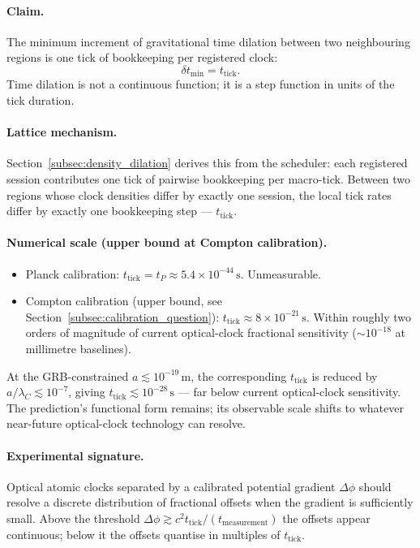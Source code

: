 \paragraph{Claim.}
The minimum increment of gravitational time dilation between two
neighbouring regions is one tick of bookkeeping per registered
clock:
\begin{equation}
    \delta t_\text{min} = t_\text{tick}.
    \label{eq:min_dilation_pred}
\end{equation}
Time dilation is not a continuous function; it is a step function in
units of the tick duration.

\paragraph{Lattice mechanism.}
Section~\ref{subsec:density_dilation} derives this from the
scheduler: each registered session contributes one tick of pairwise
bookkeeping per macro-tick. Between two regions whose clock
densities differ by exactly one session, the local tick rates differ
by exactly one bookkeeping step --- $t_\text{tick}$.

\paragraph{Numerical scale (upper bound at Compton calibration).}

\begin{itemize}
    \item Planck calibration: $t_\text{tick} = t_P \approx 5.4 \times 10^{-44}\,\text{s}$.
    Unmeasurable.
    \item Compton calibration (upper bound, see
    Section~\ref{subsec:calibration_question}): $t_\text{tick} \approx 8 \times 10^{-21}\,\text{s}$.
    Within roughly two orders of magnitude of current optical-clock
    fractional sensitivity ($\sim 10^{-18}$ at millimetre baselines).
\end{itemize}
At the GRB-constrained $a \lesssim 10^{-19}\,\text{m}$, the
corresponding $t_\text{tick}$ is reduced by $a/\lambda_C \lesssim 10^{-7}$,
giving $t_\text{tick} \lesssim 10^{-28}\,\text{s}$ --- far below
current optical-clock sensitivity. The prediction's functional form
remains; its observable scale shifts to whatever near-future
optical-clock technology can resolve.

\paragraph{Experimental signature.}
Optical atomic clocks separated by a calibrated potential gradient
$\Delta\phi$ should resolve a discrete distribution of fractional
offsets when the gradient is sufficiently small. Above the threshold
$\Delta\phi \gtrsim c^2 t_\text{tick}/(t_\text{measurement})$ the
offsets appear continuous; below it the offsets quantise in
multiples of $t_\text{tick}$.

